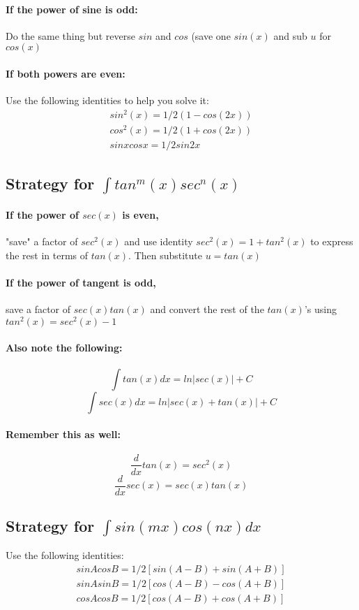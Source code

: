\documentclass[a4paper,12pt]{report}
\begin{document}
\paragraph{If the power of sine is odd:} 
Do the same thing but reverse $sin$ and $cos$ (save one $sin(x)$ and sub $u$ for $cos(x)$
\paragraph{If both powers are even:} 
Use the following identities to help you solve it:
\begin{eqnarray}
sin^2 (x) = 1/2 (1-cos(2x)) \\
cos^2 (x) = 1/2 (1+cos(2x)) \\
sinxcosx = 1/2 sin2x
\end{eqnarray}

\subsection{Strategy for $\int tan^m (x)sec^n (x)$}
\paragraph{If the power of $sec(x)$ is even,} "save" a factor of $sec^2 (x)$ and use identity $sec^2 (x) = 1+tan^2 (x)$ to express the rest in terms of $tan(x)$. Then substitute $u = tan(x)$
\paragraph{If the power of tangent is odd,} save a factor of $sec(x)tan(x)$ and convert the rest of the $tan(x)$'s using $tan^2(x) = sec^2 (x) - 1$ 
\paragraph{Also note the following:} $$\int tan(x) dx = ln|sec(x)| + C$$ $$\int sec(x) dx = ln|sec(x) + tan(x)| + C$$
\paragraph{Remember this as well:} $$\frac{d}{dx} tan(x) = sec^2(x)$$ $$\frac{d}{dx} sec(x) = sec(x)tan(x)$$

\subsection{Strategy for $\int sin(mx)cos(nx) dx$}
Use the following identities:
\begin{eqnarray}
sin A cos B = 1/2 [sin(A-B) + sin(A+B)] \\
sin A sin B = 1/2 [cos(A-B) - cos(A+B)] \\
cos A cos B = 1/2 [cos(A-B) + cos(A+B)]
\end{eqnarray}
\end{document}
